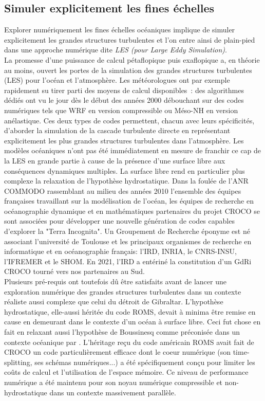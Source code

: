 \subsection{Simuler explicitement les fines échelles}
\color{blue}
Explorer numériquement les fines échelles océaniques implique de simuler explicitement les grandes structures turbulentes et l'on entre ainsi de plain-pied dans une approche numérique dite \textit{LES (pour \textit{Large Eddy Simulation})}.\\
La promesse d’une puissance de calcul pétaflopique puis exaflopique a, en théorie au moins, ouvert les portes de la simulation des grandes structures turbulentes (LES) pour l’océan et l’atmosphère. Les météorologues ont par exemple rapidement su tirer parti des moyens de calcul disponibles : des algorithmes dédiés ont vu le jour dès le début des années 2000 débouchant sur des codes numériques tels que WRF en version compressible ou Méso-NH en version anélastique. Ces deux types de codes permettent, chacun avec leurs spécificités, d’aborder la simulation de la cascade turbulente directe en représentant explicitement les plus grandes structures turbulentes dans l’atmosphère.
Les modèles océaniques n’ont pas été immédiatement en mesure de franchir ce cap de la LES en grande partie à cause de la présence d’une surface libre aux conséquences dynamiques multiples. La surface libre rend en particulier plus complexe la relaxation de l’hypothèse hydrostatique. Dans la foulée de l’ANR COMMODO rassemblant au milieu des années 2010 l’ensemble des équipes françaises travaillant sur la modélisation de l’océan, les équipes de recherche en océanographie dynamique et en mathématiques partenaires du projet CROCO se sont associées pour développer une nouvelle génération de codes capables d'explorer la "Terra Incognita". Un Groupement de Recherche éponyme est né associant l’université de Toulouse et les principaux organismes de recherche en informatique et en océanographie français: l’IRD, INRIA, le CNRS-INSU, l’IFREMER et le SHOM. En 2021, l’IRD a entériné la constitution d’un GdRi CROCO tourné vers nos partenaires au Sud.\\
Plusieurs pré-requis ont toutefois dû être satisfaits avant de lancer une exploration numérique des grandes structures turbulentes dans un contexte réaliste aussi complexe que celui du détroit de Gibraltar.
L'hypothèse hydrostatique, elle-aussi héritée du code ROMS, devait à minima être remise en cause en demeurant dans le contexte d'un océan à surface libre. Ceci fut chose en fait en relaxant aussi l'hypothèse de Boussinesq comme préconisée dans un contexte océanique par \cite{auclair_non-hydrostatic_2018}. L'héritage reçu du code américain ROMS \citep{shchepetkin_regional_2005} avait fait de CROCO un code particulièrement efficace dont le coeur numérique (son time-splitting, ses schémas numériques...) a été spécifiquement conçu pour limiter les coûts de calcul et l'utilisation de l'espace mémoire. Ce niveau de performance numérique a été maintenu pour son noyau numérique compressible et non-hydrostatique dans un contexte massivement parallèle.\\
